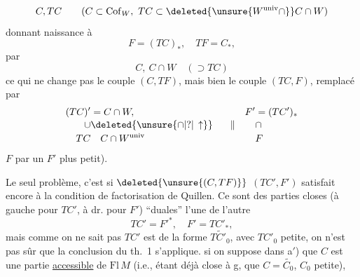 
\[
 C,TC\qquad(C\subset\mathrm{Cof}_W,\ TC\subset\deleted{\unsure{W^{\mathrm{univ}}\cap}}C\cap W)
\]
donnant naissance à
\[
 F=(TC)_*,\quad TF=C_*,
\]
par
\[
 C,\ C\cap W\quad(\supset TC)
\]
ce qui ne change pas le couple $(C,TF)$,
mais bien le couple $(TC,F)$, remplacé
par
\[
 \begin{aligned}
 (TC)' &={} C\cap W,& F'&=(TC')_*\\[-2pt]
 \cup &\deleted{\unsure{\cap|?|\,\uparrow}}\hspace{1.5em}\parallel &&\cap\\[-2pt]
 TC &\quad C\cap W^{\mathrm{univ}}&&F
 \end{aligned}
\]
\unsure{--}  $F$ par un $F'$ plus petit).

Le seul problème, c'est si $\deleted{\unsure{(C,TF)}}$
$(TC',F')$ satisfait encore à la condition
de factorisation de Quillen. Ce sont des
parties closes (à gauche pour $TC'$, à dr.
pour $F'$) ``duales'' l'une de l'autre
\[
 TC'={F'}^{*},\quad F'=TC'_*,
\]
mais comme on ne sait pas 
$TC'$ est  de la forme $\widetilde{TC'_0}$, avec
$TC'_0$ petite, on n'est pas sûr que la 
conclusion du th.~1 s'applique.  
si on suppose dans a$'$) que $C$ est
une partie \uline{accessible} de $\mathrm{Fl}\,M$ (i.e., étant
déjà close à g, que $C=\widetilde{C_0}$, $C_0$ petite),
